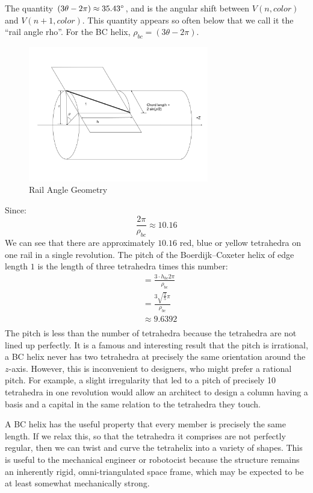 \documentclass[11pt]{article}
\begin{document}
The quantity $ (3 \theta - 2 \pi) \approx 35.43 \degree $, and is the angular shift between $V(n,color)$ and
$V(n+1,color)$. This quantity appears so often below that we call it the ``rail angle rho''. For the BC helix, $\rho_{bc} = (3 \theta - 2 \pi)$.

\begin{figure}[H]
  \label{railanglefig}
     \centering
     \includegraphics[width=0.7\textwidth]{figures/RailAngleGeometry.png}
     \caption{Rail Angle Geometry}
 \end{figure}

Since:
\[ \frac{2 \pi}{\rho_{bc}} \approx 10.16
\]
We can see that there are approximately $10.16$ red, blue or yellow tetrahedra on one rail in a single revolution.
The pitch of the Boerdijk--Coxeter helix of edge length $1$ is the length of three tetrahedra times this number:
\begin{align*}
  &= \frac{3 \cdot h_{bc} 2 \pi }{\rho_{bc}} \\
  &= \frac{3  \sqrt{\frac{2}{5}}  \pi}{\rho_{bc}} \\
  &\approx 9.6392 \\
\end{align*}
The pitch is less than the number of tetrahedra because the tetrahedra are not lined up perfectly.
It is a famous and interesting result that the pitch is irrational, a BC helix never has two tetrahedra
at precisely the same orientation around the $z$-axis. However, this is inconvenient to designers, who
might prefer a rational pitch. For example, a slight irregularity that led to a pitch of precisely 10 tetrahedra
in one revolution would allow an architect to design a column having a basis and a capital in the same relation to the tetrahedra
they touch.

A BC helix has the useful property that every member is precisely the same length. If we relax this, so that the tetrahedra it
comprises are not perfectly regular, then we can twist and curve the tetrahelix into a variety of shapes. This is useful to
the mechanical engineer or robotocist because the structure remains an inherently rigid, omni-triangulated space frame, which
may be expected to be at least somewhat mechanically strong.
\end{document}
